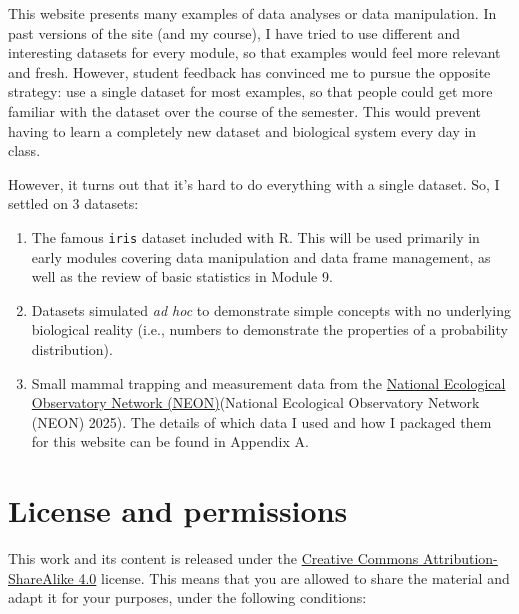 \documentclass[
  13,
  letterpaper,
]{report}
\providecommand{\tightlist}{%
  \setlength{\itemsep}{0pt}\setlength{\parskip}{0pt}}
\begin{document}

This website presents many examples of data analyses or data
manipulation. In past versions of the site (and my course), I have tried
to use different and interesting datasets for every module, so that
examples would feel more relevant and fresh. However, student feedback
has convinced me to pursue the opposite strategy: use a single dataset
for most examples, so that people could get more familiar with the
dataset over the course of the semester. This would prevent having to
learn a completely new dataset and biological system every day in class.

However, it turns out that it's hard to do everything with a single
dataset. So, I settled on 3 datasets:

\begin{enumerate}
\def\labelenumi{\arabic{enumi}.}
\tightlist
\item
  The famous \texttt{iris} dataset included with R. This will be used
  primarily in early modules covering data manipulation and data frame
  management, as well as the review of basic statistics in Module 9.
\item
  Datasets simulated \emph{ad hoc} to demonstrate simple concepts with
  no underlying biological reality (i.e., numbers to demonstrate the
  properties of a probability distribution).
\item
  Small mammal trapping and measurement data from the
  \href{https://www.neonscience.org/data-collection/small-mammals}{National
  Ecological Observatory Network (NEON)}(National Ecological Observatory
  Network (NEON) 2025). The details of which data I used and how I
  packaged them for this website can be found in Appendix A.
\end{enumerate}

\section*{License and permissions}\label{license-and-permissions}


This work and its content is released under the
\href{https://creativecommons.org/licenses/by-sa/4.0/}{Creative Commons
Attribution-ShareAlike 4.0} license. This means that you are allowed to
share the material and adapt it for your purposes, under the following
conditions:
\end{document}
